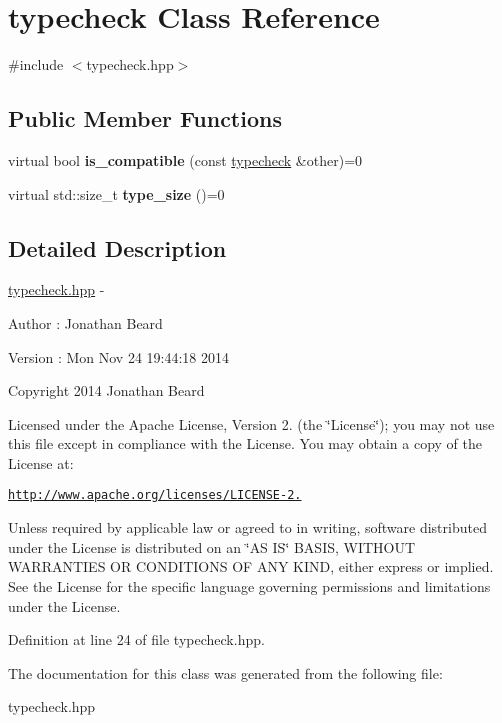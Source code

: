 \hypertarget{classtypecheck}{}\section{typecheck Class Reference}
\label{classtypecheck}


{\ttfamily \#include $<$typecheck.\+hpp$>$}

\subsection*{Public Member Functions}
\begin{DoxyCompactItemize}
\item 
\hypertarget{classtypecheck_a4af7e7b2f8a32d67bde069f7299c8e7f}{}\label{classtypecheck_a4af7e7b2f8a32d67bde069f7299c8e7f} 
virtual bool {\bfseries is\+\_\+compatible} (const \hyperlink{classtypecheck}{typecheck} \&other)=0
\item 
\hypertarget{classtypecheck_ab6e6b23972084805677daa38307df92a}{}\label{classtypecheck_ab6e6b23972084805677daa38307df92a} 
virtual std\+::size\+\_\+t {\bfseries type\+\_\+size} ()=0
\end{DoxyCompactItemize}


\subsection{Detailed Description}
\hyperlink{typecheck_8hpp_source}{typecheck.\+hpp} -\/ \begin{DoxyAuthor}{Author}
\+: Jonathan Beard 
\end{DoxyAuthor}
\begin{DoxyVersion}{Version}
\+: Mon Nov 24 19\+:44\+:18 2014
\end{DoxyVersion}
Copyright 2014 Jonathan Beard

Licensed under the Apache License, Version 2. (the \char`\"{}\+License\char`\"{}); you may not use this file except in compliance with the License. You may obtain a copy of the License at\+:

\href{http://www.apache.org/licenses/LICENSE-2.0}{\tt http\+://www.\+apache.\+org/licenses/\+L\+I\+C\+E\+N\+S\+E-\/2.}

Unless required by applicable law or agreed to in writing, software distributed under the License is distributed on an \char`\"{}\+A\+S I\+S\char`\"{} B\+A\+S\+IS, W\+I\+T\+H\+O\+UT W\+A\+R\+R\+A\+N\+T\+I\+ES OR C\+O\+N\+D\+I\+T\+I\+O\+NS OF A\+NY K\+I\+ND, either express or implied. See the License for the specific language governing permissions and limitations under the License. 

Definition at line 24 of file typecheck.\+hpp.



The documentation for this class was generated from the following file\+:\begin{DoxyCompactItemize}
\item 
typecheck.\+hpp\end{DoxyCompactItemize}
